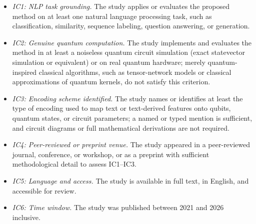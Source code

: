 \documentclass{ieeeaccess}
\begin{document}
\begin{itemize}
    \item \textit{IC1: NLP task grounding.} The study applies or evaluates the proposed method on at least one natural language processing task, such as classification, similarity, sequence labeling, question answering, or generation.

    \item \textit{IC2: Genuine quantum computation.} The study implements and evaluates the method in at least a noiseless quantum circuit simulation (exact statevector simulation or equivalent) or on real quantum hardware; merely quantum-inspired classical algorithms, such as tensor-network models or classical approximations of quantum kernels, do not satisfy this criterion.

    \item \textit{IC3: Encoding scheme identified.} The study names or identifies at least the type of encoding used to map text or text-derived features onto qubits, quantum states, or circuit parameters; a named or typed mention is sufficient, and circuit diagrams or full mathematical derivations are not required.

    \item \textit{IC4: Peer-reviewed or preprint venue.} The study appeared in a peer-reviewed journal, conference, or workshop, or as a preprint with sufficient methodological detail to assess IC1--IC3.

    \item \textit{IC5: Language and access.} The study is available in full text, in English, and accessible for review.

    \item \textit{IC6: Time window.} The study was published between 2021 and 2026 inclusive.
\end{itemize}
\end{document}
